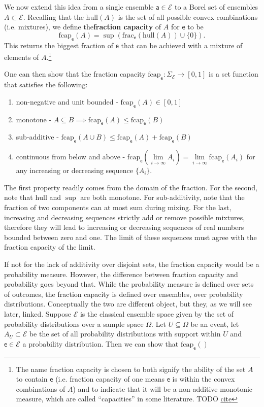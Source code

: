 \documentclass[10pt,twocolumn, nofootinbib]{revtex4-2}
\newcommand\hull{\mathrm{hull}}
\newcommand\fraction{\mathrm{frac}}
\newcommand\frcap{\mathrm{fcap}}
\newcommand{\ens}[1][e] {\mathsf{#1}} %
\newcommand{\Ens}[1][E] {\mathcal{#1}} %
\begin{document}
We now extend this idea from a single ensemble $\ens[a] \in \Ens$ to a Borel set of ensembles $A \subset \Ens$. Recalling that the $\hull(A)$ is the set of all possible convex combinations (i.e. mixtures), we define the\textbf{fraction capacity} of $A$ for $\ens$ to be
\begin{equation}
	\frcap_{\ens}(A) = \sup(\fraction_{\ens}(\hull(A))\cup\{0\}).
\end{equation}
This returns the biggest fraction of $\ens$ that can be achieved with a mixture of elements of $A$.\footnote{The name fraction capacity is chosen to both signify the ability of the set $A$ to contain $\ens$ (i.e. fraction capacity of one means $\ens$ is within the convex combinations of $A$) and to indicate that it will be a non-additive monotonic measure, which are called ``capacities'' in some literature. TODO \href{ https://link.springer.com/book/10.1007/978-3-319-03155-2}{cite} }

One can then show that the fraction capacity $\frcap_{\ens} : \Sigma_{\Ens} \to [0,1]$ is a set function that satisfies the following:
\begin{enumerate}
	\item non-negative and unit bounded - $\frcap_{\ens}(A) \in [0,1]$
	\item monotone - $A \subseteq B \implies \frcap_{\ens}(A) \leq \frcap_{\ens}(B)$
	\item sub-additive - $\frcap_{\ens}(A \cup B) \leq \frcap_{\ens}(A) + \frcap_{\ens}(B)$
	\item continuous from below and above - $\frcap_{\ens}(\lim\limits_{i \to \infty} A_i) = \lim\limits_{i \to \infty} \frcap_{\ens}(A_i)$ for any increasing or decreasing sequence $\{A_i\}$.
\end{enumerate}

The first property readily comes from the domain of the fraction. For the second, note that $\hull$ and $\sup$ are both monotone. For sub-additivity, note that the fraction of two components can at most sum during mixing. For the last, increasing and decreasing sequences strictly add or remove possible mixtures, therefore they will lead to increasing or decreasing sequences of real numbers bounded between zero and one. The limit of these sequences must agree with the fraction capacity of the limit.

If not for the lack of additivity over disjoint sets, the fraction capacity would be a probability measure. However, the difference between fraction capacity and probability goes beyond that. While the probability measure is defined over sets of outcomes, the fraction capacity is defined over ensembles, over probability distributions. Conceptually the two are different object, but they, as we will see later, linked. Suppose $\Ens$ is the classical ensemble space given by the set of probability distributions over a sample space $\Omega$. Let $U \subseteq \Omega$ be an event, let $A_U \subset \Ens$ be the set of all probability distributions with support within $U$ and $\ens \in \Ens$ a probability distribution. Then we can show that $\frcap_{\ens}() $
\end{document}
